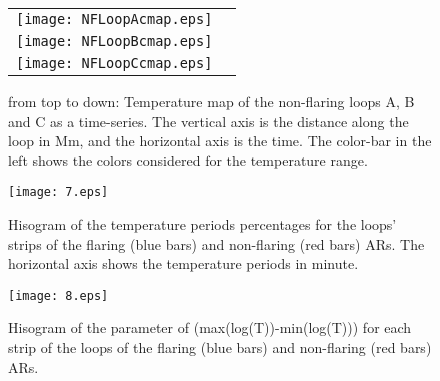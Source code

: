 \documentclass[oneside,onecolumn]{article}
\begin{document}
\begin{figure}[htp]

  \centering

\begin{tabular}{cc} 
    \texttt{[image: NFLoopAcmap.eps]}\\
    \texttt{[image: NFLoopBcmap.eps]}\\
    \texttt{[image: NFLoopCcmap.eps]}\\
  \end{tabular}
\caption{from top to down: Temperature map of the non-flaring loops A, B and C as a time-series. The vertical axis is the distance along the loop in Mm, and the horizontal axis is the time. The color-bar in the left shows the colors considered for the temperature range.}
\label{fig6}
\end{figure}


 
%
\begin{figure}
 \centering
 \texttt{[image: 7.eps]}
\caption{Hisogram of the temperature periods percentages for the loops' strips of the flaring (blue bars) and non-flaring (red bars) ARs. The horizontal axis shows the temperature periods in minute.}
\label{fig7}
\end{figure}

\begin{figure}
\centering
\texttt{[image: 8.eps]}
\caption{Hisogram of the parameter of (max(log(T))-min(log(T))) for each strip of the loops of the flaring (blue bars) and non-flaring (red bars) ARs. 
}
\label{fig8}
\end{figure}
\end{document}

